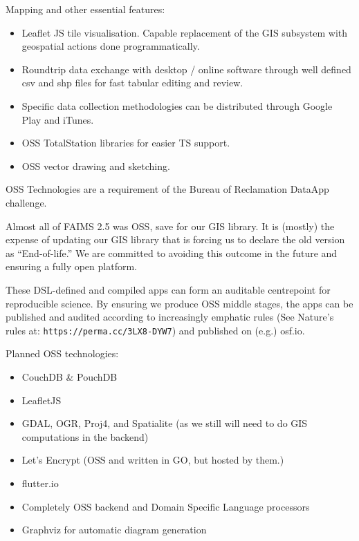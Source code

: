 \documentclass[unknownkeysallowed,usepdftitle=false, parskip=full, t]{beamer}
\newcommand{\secvariable}{nothing}
\newcommand{\mysection}[1]{\renewcommand{\secvariable}{#1}
}
\begin{document}
\begin{frame}[c]
\parbox{\linewidth}{

Mapping and other essential features:

\begin{itemize}
\item Leaflet JS tile visualisation. Capable replacement of the GIS subsystem with geospatial actions done programmatically.
\item Roundtrip data exchange with desktop / online software through well defined csv and shp files for fast tabular editing and review.
\item Specific data collection methodologies can be distributed through Google Play and iTunes.
\item OSS TotalStation libraries for easier TS support.
\item OSS vector drawing and sketching.

\end{itemize}
}


\end{frame}

\mysection{oss}
\begin{frame}\label{\secvariable}
\parbox{\linewidth}{
OSS Technologies are a requirement of the Bureau of Reclamation DataApp challenge.

\vspace{12 pt}

Almost all of FAIMS 2.5 was OSS, save for our GIS library. It is (mostly) the expense of updating our GIS library that is forcing us to declare the old version as ``End-of-life.'' We are committed to avoiding this outcome in the future and ensuring a fully open platform.

\vspace{12 pt}

These DSL-defined and compiled apps can form an auditable centrepoint for reproducible science. By ensuring we produce OSS middle stages, the apps can be published and audited according to increasingly emphatic rules (See Nature's rules at: \texttt{https://perma.cc/3LX8-DYW7}) and published on (e.g.) osf.io. 
}
\end{frame}
\begin{frame}
\parbox{\linewidth}{
Planned OSS technologies:

\begin{itemize}
\item CouchDB \& PouchDB
\item LeafletJS
\item GDAL, OGR, Proj4, and Spatialite (as we still will need to do GIS computations in the backend)
\item Let's Encrypt (OSS and written in GO, but hosted by them.)
\item flutter.io
\item Completely OSS backend and Domain Specific Language processors
\item Graphviz for automatic diagram generation
\end{itemize}
}
\end{frame}
\end{document}
